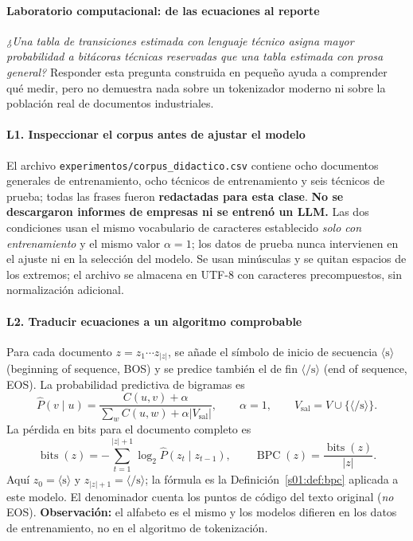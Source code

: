 \paragraph{Laboratorio computacional: de las ecuaciones al reporte}
\label{s01:lab:comp}
\begin{idea}
\emph{¿Una tabla de transiciones estimada con lenguaje técnico asigna mayor
probabilidad a bitácoras técnicas reservadas que una tabla estimada con prosa general?}
Responder esta pregunta construida en pequeño ayuda a comprender qué medir,
pero no demuestra nada sobre un tokenizador moderno ni sobre la población real
de documentos industriales.
\end{idea}
\paragraph{L1. Inspeccionar el corpus antes de ajustar el modelo}
El archivo \nolinkurl{experimentos/corpus_didactico.csv} contiene ocho documentos
generales de entrenamiento, ocho técnicos de entrenamiento y seis técnicos
de prueba; todas las frases fueron \textbf{redactadas para esta clase}.
\textbf{No se descargaron informes de empresas ni se entrenó un LLM.}
Las dos condiciones usan el mismo vocabulario de caracteres establecido
\emph{solo con entrenamiento} y el mismo valor $\alpha=1$; los datos
de prueba nunca intervienen en el ajuste ni en la selección del modelo.
Se usan minúsculas y se quitan espacios de los extremos; el archivo se almacena
en UTF-8 con caracteres precompuestos, sin normalización adicional.

\paragraph{L2. Traducir ecuaciones a un algoritmo comprobable}
Para cada documento $z=z_1\cdots z_{|z|}$, se añade el símbolo de inicio de secuencia
$\langle\mathrm s\rangle$ (beginning of sequence, BOS) y se predice también el de fin $\langle/\mathrm s\rangle$ (end of sequence, EOS). La probabilidad
predictiva de bigramas es
\[
\widehat P(v\mid u)=\frac{C(u,v)+\alpha}
{\sum_w C(u,w)+\alpha|V_{\mathrm{sal}}|},\qquad \alpha=1,\qquad V_{\mathrm{sal}}=V\cup\{\langle/\mathrm s\rangle\}.
\]
La pérdida en bits para el documento completo es
\[
\operatorname{bits}(z)=-\sum_{t=1}^{|z|+1}\log_2 \widehat P(z_t\mid z_{t-1}),
\qquad \operatorname{BPC}(z)=\frac{\operatorname{bits}(z)}{|z|}.
\]
Aquí $z_0=\langle\mathrm s\rangle$ y $z_{|z|+1}=\langle/\mathrm s\rangle$; la fórmula es la Definición~\ref{s01:def:bpc} aplicada a este modelo. El denominador
cuenta los puntos de código del texto original (\emph{no} EOS).
\textbf{Observación:} el alfabeto es el mismo y los modelos difieren en
los datos de entrenamiento, no en el algoritmo de tokenización.

